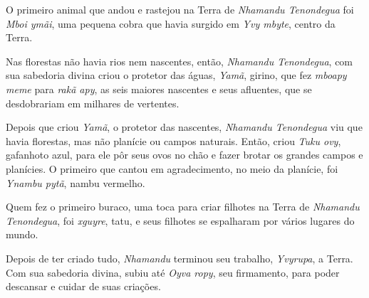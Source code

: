
O primeiro animal que andou e rastejou na Terra de \emph{Nhamandu
Tenondegua} foi \emph{Mboi ymãi}, uma pequena cobra que havia surgido em
\emph{Yvy mbyte}, centro da Terra.


Nas florestas não havia rios nem nascentes, então, \emph{Nhamandu
Tenondegua}, com sua sabedoria divina criou o protetor das águas,
\emph{Yamã}, girino, que fez \emph{mboapy meme} para \emph{rakã apy}, as
seis maiores nascentes e seus afluentes, que se desdobrariam em milhares
de vertentes.



Depois que criou \emph{Yamã}, o protetor das nascentes, \emph{Nhamandu
Tenondegua} viu que havia florestas, mas não planície ou campos
naturais. Então, criou \emph{Tuku ovy}, gafanhoto azul, para ele pôr
seus ovos no chão e fazer brotar os grandes campos e planícies. O primeiro que cantou em agradecimento, no meio da planície, foi
\emph{Ynambu pytã}, nambu vermelho.



 

Quem fez o primeiro buraco, uma toca para criar filhotes na Terra de
\emph{Nhamandu Tenondegua}, foi \emph{xguyre}, tatu, e seus filhotes se
espalharam por vários lugares do mundo.

Depois de ter criado tudo, \emph{Nhamandu} terminou seu trabalho,
\emph{Yvyrupa}, a Terra. Com sua sabedoria divina, subiu até \emph{Oyva
ropy}, seu firmamento, para poder descansar e cuidar de suas
criações.
